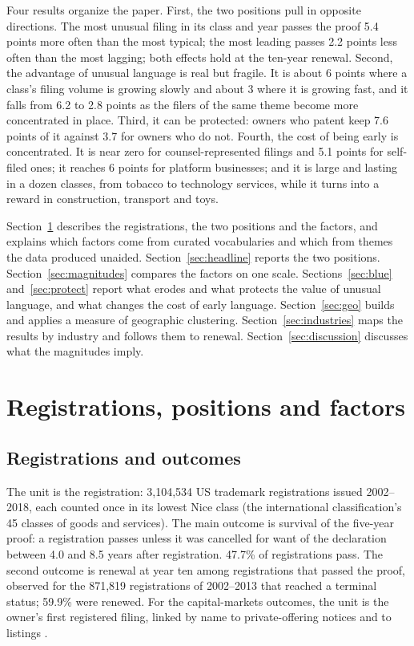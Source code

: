 Four results organize the paper. First, the two positions pull in
opposite directions. The most unusual filing in its class and year
passes the proof 5.4 points more often than the most typical; the most
leading passes 2.2 points less often than the most lagging; both
effects hold at the ten-year renewal. Second, the advantage of unusual
language is real but fragile. It is about 6 points where a class's
filing volume is growing slowly and about 3 where it is growing fast,
and it falls from 6.2 to 2.8 points as the filers of the same theme
become more concentrated in place. Third, it can be protected: owners
who patent keep 7.6 points of it against 3.7 for owners who do not.
Fourth, the cost of being early is concentrated. It is near zero for
counsel-represented filings and 5.1 points for self-filed ones; it
reaches 6 points for platform businesses; and it is large and lasting in
a dozen classes, from tobacco to technology services, while it turns
into a reward in construction, transport and toys.

Section~\ref{sec:data} describes the registrations, the two positions
and the factors, and explains which factors come from curated
vocabularies and which from themes the data produced unaided.
Section~\ref{sec:headline} reports the two positions.
Section~\ref{sec:magnitudes} compares the factors on one scale.
Sections~\ref{sec:blue} and~\ref{sec:protect} report what erodes and
what protects the value of unusual language, and what changes the cost
of early language. Section~\ref{sec:geo} builds and applies a measure of
geographic clustering. Section~\ref{sec:industries} maps the results by
industry and follows them to renewal. Section~\ref{sec:discussion}
discusses what the magnitudes imply.

\section{Registrations, positions and factors}\label{sec:data}

\subsection{Registrations and outcomes}

The unit is the registration: 3,104,534 US trademark registrations issued
2002--2018, each counted once in its lowest Nice class (the international
classification's 45 classes of goods and services). The main outcome is
survival of the five-year proof: a registration passes unless it was
cancelled for want of the declaration between 4.0 and 8.5 years after
registration. 47.7\% of registrations pass. The second outcome is
renewal at year ten among registrations that passed the proof, observed
for the 871,819 registrations of 2002--2013 that reached a terminal
status; 59.9\% were renewed. For the capital-markets outcomes, the unit
is the owner's first registered filing, linked by name to private-offering
notices and to listings \citep{SilverCorpus2026}.

